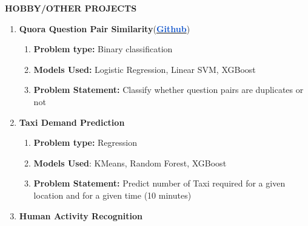 \documentclass[12pt]{article}
\begin{document}
\vspace{\baselineskip}

\vspace{\baselineskip}

\vspace{\baselineskip}

\vspace{\baselineskip}
\begin{FlushLeft}
\textbf{HOBBY/OTHER PROJECTS}
\end{FlushLeft}\par

\begin{enumerate}
	\item {\fontsize{14pt}{16.8pt}\selectfont \textbf{Quora Question Pair Similarity}}(\href{https://github.com/SachinKalsi/machine-learning-case-studies/tree/master/quora_question_pairs}{\textbf{\textcolor[HTML]{1155CC}{Github}}})
\begin{enumerate}
	\item \textbf{Problem type: }Binary classification\par

	\item \textbf{Models Used: }Logistic Regression, Linear SVM, XGBoost\par

	\item \textbf{Problem Statement:} Classify whether question pairs are duplicates or not\\
\end{enumerate}


	\item {\fontsize{14pt}{16.8pt}\selectfont \textbf{Taxi Demand Prediction}\par}

\begin{enumerate}
	\item \textbf{Problem type: }Regression\par

	\item \textbf{Models Used}: KMeans, Random Forest, XGBoost\par

	\item \textbf{Problem Statement: }Predict number of Taxi required for a given location and for a given time (10 minutes)\\
\par


\end{enumerate}
	\item {\fontsize{14pt}{16.8pt}\selectfont \textbf{Human Activity Recognition}\par}\par


\end{enumerate}
\end{document}

